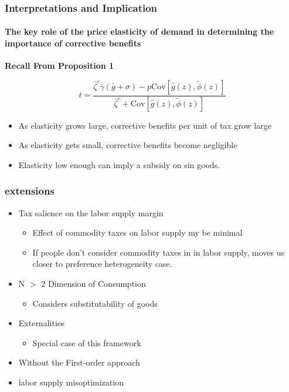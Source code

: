 \documentclass{beamer}
\newcommand{\Cov}{\mathrm{Cov}}
\begin{document}
\begin{frame}
\frametitle{Interpretations and Implication}
\framesubtitle{The key role of the price elasticity of demand in determining the importance of corrective benefits}

\textbf{Recall From Proposition 1} 

$$ t = \frac{\bar{\zeta}^c \bar{\gamma} (\bar{g}  + \sigma) - p\Cov \left[ \hat{g}(z),\tilde{\phi}(z) \right]}{\bar{\zeta}^c + \Cov \left[\hat{g}(z), \tilde{\phi}(z) \right]}$$ 

\begin{itemize}
	\item As elasticity grows large, corrective benefits per unit of tax grow large
	\item As elasticity gets small, corrective benefits become negligible
	\item Elasticity low enough can imply a subsidy on sin goods.
\end{itemize}


\end{frame}




\begin{frame}
\frametitle{extensions} 
\begin{itemize}
	\item Tax salience on the labor supply margin 
	\begin{itemize}
		\item Effect of commodity taxes on labor supply my be minimal 
		\item If people don't consider commodity taxes in in labor supply, moves us closer to preference heterogeneity case.
	\end{itemize}
	\item N $>$ 2 Dimension of Consumption 
	\begin{itemize}
		\item Considers substitutability of goods
	\end{itemize}
	\item Externalities 
	\begin{itemize}
		\item Special case of this framework 
	\end{itemize}
	\item Without the First-order approach
	\item labor supply misoptimization 
\end{itemize}

\end{frame}
\end{document}
